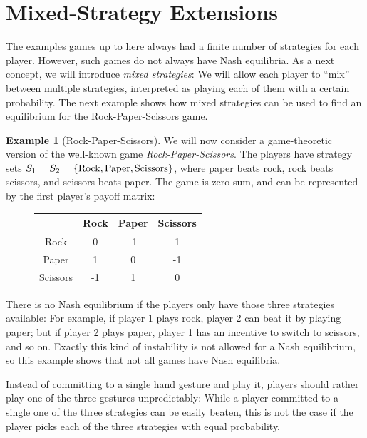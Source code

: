 \documentclass[a4paper,DIV=11,abstracton,twoside=semi]{scrreprt}
\theoremstyle{definition}
\newtheorem{ex}[thm]{Example} %
\begin{document}
    \section{Mixed-Strategy Extensions}
    The examples games up to here always had a finite number of strategies for each player.
    However, such games do not always have Nash equilibria. As a next concept, we will introduce \emph{mixed strategies}: We will allow each player to “mix” between multiple strategies, interpreted as playing each of them with a certain probability.
    The next example shows how mixed strategies can be used to find an equilibrium for the Rock-Paper-Scissors game.
    
    \begin{ex}[Rock-Paper-Scissors]
        We will now consider a game-theoretic version of the well-known game \emph{Rock-Paper-Scissors}.
        The players have strategy sets $S_1 = S_2 = \{\text{Rock}, \text{Paper}, \text{Scissors}\}$, where paper beats rock, rock beats scissors, and scissors beats paper. The game is zero-sum, and can be represented by the first player's payoff matrix:
        \begin{figure}[h]
            \centering
            \begin{tabular}{c|c|c|c|}
            	         & Rock & Paper & Scissors \\ \hline
            	  Rock   &  0   &  -1   &    1     \\ \hline
            	 Paper   &  1   &   0   &    -1    \\ \hline
            	Scissors &  -1  &   1   &    0     \\ \hline
            \end{tabular}
        \end{figure}
    
        There is no Nash equilibrium if the players only have those three strategies available: For example, if player 1 plays rock, player 2 can beat it by playing paper; but if player 2 plays paper, player 1 has an incentive to switch to scissors, and so on. Exactly this kind of instability is not allowed for a Nash equilibrium, so this example shows that not all games have Nash equilibria.
        
        Instead of committing to a single hand gesture and play it, players should rather play one of the three gestures unpredictably: While a player committed to a single one of the three strategies can be easily beaten, this is not the case if the player picks each of the three strategies with equal probability.
        \label{ex:rockPaperScissors}
    \end{ex}
\end{document}
